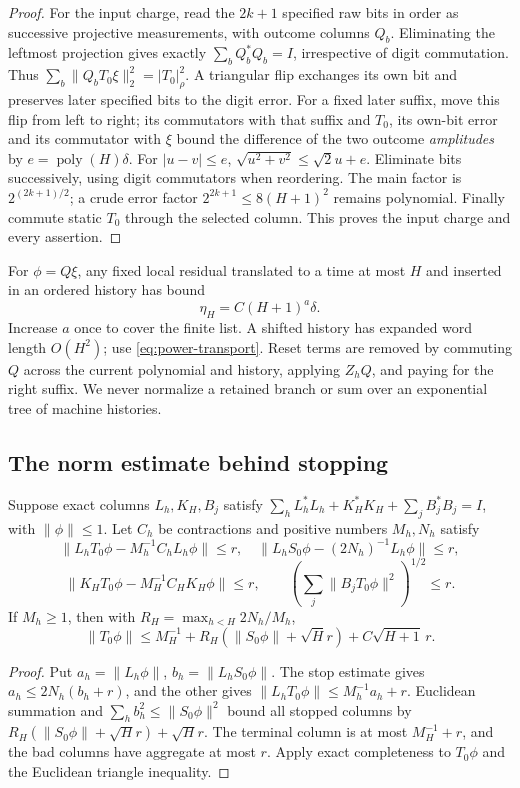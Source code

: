 \begin{proof}
For the input charge, read the $2k+1$ specified raw bits in order as successive projective measurements, with outcome columns $Q_b$. Eliminating the leftmost projection gives exactly $\sum_bQ_b^*Q_b=I$, irrespective of digit commutation. Thus $\sum_b\|Q_bT_0\xi\|_2^2=|T_0|_\rho^2$.
A triangular flip exchanges its own bit and preserves later specified bits to the digit error. For a fixed later suffix, move this flip from left to right; its commutators with that suffix and $T_0$, its own-bit error and its commutator with $\xi$ bound the difference of the two outcome \emph{amplitudes} by $e=\operatorname{poly}(H)\delta$. For $|u-v|\le e$,
$\sqrt{u^2+v^2}\le\sqrt2u+e$. Eliminate bits successively, using digit commutators when reordering. The main factor is $2^{(2k+1)/2}$; a crude error factor $2^{2k+1}\le8(H+1)^2$ remains polynomial. Finally commute static $T_0$ through the selected column. This proves the input charge and every assertion.
\end{proof}

For $\phi=Q\xi$, any fixed local residual translated to a time at most $H$ and inserted in an ordered history has bound
\begin{equation}\label{eq:power-ledger}
 \eta_H=C(H+1)^a\delta.
\end{equation}
Increase $a$ once to cover the finite list. A shifted history has expanded word length $O(H^2)$; use \eqref{eq:power-transport}. Reset terms are removed by commuting $Q$ across the current polynomial and history, applying $Z_hQ$, and paying for the right suffix. We never normalize a retained branch or sum over an exponential tree of machine histories.

\subsection{The norm estimate behind stopping}
\begin{lemma}\label{lem:power-stopped}
Suppose exact columns $L_h,K_H,B_j$ satisfy $\sum_hL_h^*L_h+K_H^*K_H+\sum_jB_j^*B_j=I$, with $\|\phi\|\le1$. Let $C_h$ be contractions and positive numbers $M_h,N_h$ satisfy
\[
 \|L_hT_0\phi-M_h^{-1}C_hL_h\phi\|\le r,\quad
 \|L_hS_0\phi-(2N_h)^{-1}L_h\phi\|\le r,
\]
\[
 \|K_HT_0\phi-M_H^{-1}C_HK_H\phi\|\le r,\qquad
 \left(\sum_j\|B_jT_0\phi\|^2\right)^{1/2}\le r.
\]
If $M_h\ge1$, then with $R_H=\max_{h<H}2N_h/M_h$,
\[
 \|T_0\phi\|\le M_H^{-1}+R_H(\|S_0\phi\|+\sqrt H r)+C\sqrt{H+1}\,r.
\]
\end{lemma}
\begin{proof}
Put $a_h=\|L_h\phi\|$, $b_h=\|L_hS_0\phi\|$. The stop estimate gives $a_h\le2N_h(b_h+r)$, and the other gives $\|L_hT_0\phi\|\le M_h^{-1}a_h+r$. Euclidean summation and $\sum_hb_h^2\le\|S_0\phi\|^2$ bound all stopped columns by $R_H(\|S_0\phi\|+\sqrt H r)+\sqrt H r$. The terminal column is at most $M_H^{-1}+r$, and the bad columns have aggregate at most $r$. Apply exact completeness to $T_0\phi$ and the Euclidean triangle inequality.
\end{proof}

